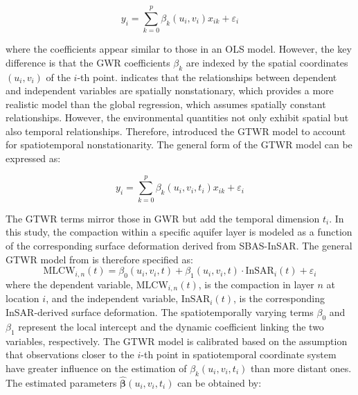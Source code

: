 \begin{equation}
y_i = \sum_{k=0}^{p} \beta_k(u_i, v_i) x_{ik} + \varepsilon_i
\label{eq:gwr}
\end{equation}




\noindent where the coefficients appear similar to those in an OLS model. However, the key difference is that the GWR coefficients \(\beta_k\) are indexed by the spatial coordinates \((u_i, v_i)\) of the \(i\)-th point.  indicates that the relationships between dependent and independent variables are spatially nonstationary, which provides a more realistic model than the global regression, which assumes spatially constant relationships. However, the environmental quantities not only exhibit spatial but also temporal relationships. Therefore, \citet{huang2010geographically} introduced the GTWR model to account for spatiotemporal nonstationarity. The general form of the GTWR model can be expressed as:

\begin{equation}
y_i = \sum_{k=0}^{p} \beta_k(u_i, v_i, t_i) x_{ik} + \varepsilon_i
\label{eq:gtwr}
\end{equation}

The GTWR terms mirror those in GWR but add the temporal dimension $t_i$. In this study, the compaction within a specific aquifer layer is modeled as a function of the corresponding surface deformation derived from SBAS-InSAR. The general GTWR model from  is therefore specified as:
%
\begin{equation}
	\text{MLCW}_{i,n}(t) = \beta_0(u_i, v_i, t) + \beta_1(u_i, v_i, t) \cdot \text{InSAR}_i(t) + \varepsilon_i
	\label{eq:gtwr_mlcw_insar}
\end{equation}
%
\noindent where the dependent variable, \(\text{MLCW}_{i,n}(t)\), is the compaction in layer \(n\) at location \(i\), and the independent variable, \(\text{InSAR}_i(t)\), is the corresponding InSAR-derived surface deformation. The spatiotemporally varying terms \(\beta_0\) and \(\beta_1\) represent the local intercept and the dynamic coefficient linking the two variables, respectively.
%
The GTWR model is calibrated based on the assumption that observations closer to the $i$-th point in spatiotemporal coordinate system have greater influence on the estimation of $\beta_k(u_i, v_i, t_i)$ than more distant ones. The estimated parameters $\hat{\boldsymbol{\beta}}(u_i, v_i, t_i)$ can be obtained by:

